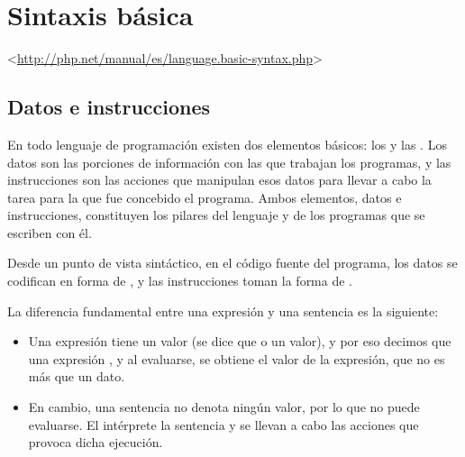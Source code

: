 \documentclass[a4paper,11pt,spanish]{sphinxmanual}
\begin{document}
\subsubsection{}
\label{\detokenize{php:display-errors-on}}

\subsubsection{}
\label{\detokenize{php:display-startup-errors-on}}

\subsubsection{}
\label{\detokenize{php:date-timezone-utc}}

\section{Sintaxis básica}
\label{\detokenize{php:sintaxis-basica}}
\textless{}\url{http://php.net/manual/es/language.basic-syntax.php}\textgreater{}


\subsection{Datos e instrucciones}
\label{\detokenize{php:datos-e-instrucciones}}
En todo lenguaje de programación existen dos elementos básicos: los  y
las . Los datos son las porciones de información con las que
trabajan los programas, y las instrucciones son las acciones que manipulan esos
datos para llevar a cabo la tarea para la que fue concebido el programa. Ambos
elementos, datos e instrucciones, constituyen los pilares del lenguaje y de los
programas que se escriben con él.

Desde un punto de vista sintáctico, en el código fuente del programa, los datos
se codifican en forma de , y las instrucciones toman la forma de
.

La diferencia fundamental entre una expresión y una sentencia es la siguiente:
\begin{itemize}
\item {} 
Una expresión tiene un valor (se dice que  o  un valor), y
por eso decimos que una expresión , y al evaluarse, se
obtiene el valor de la expresión, que no es más que un dato.

\item {} 
En cambio, una sentencia no denota ningún valor, por lo que no puede
evaluarse. El intérprete  la sentencia y se llevan a cabo las
acciones que provoca dicha ejecución.

\end{itemize}
\end{document}
